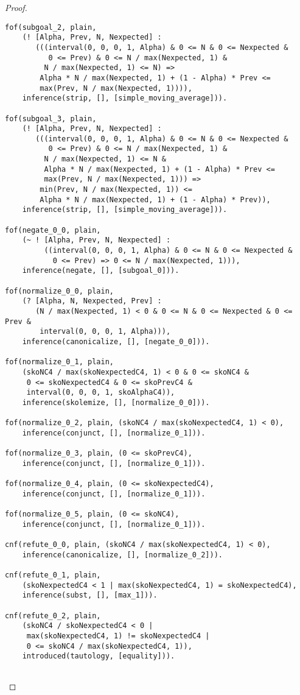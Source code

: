 \begin{proof}
\begin{verbatim}
fof(subgoal_2, plain,
    (! [Alpha, Prev, N, Nexpected] :
       (((interval(0, 0, 0, 1, Alpha) & 0 <= N & 0 <= Nexpected &
          0 <= Prev) & 0 <= N / max(Nexpected, 1) &
         N / max(Nexpected, 1) <= N) =>
        Alpha * N / max(Nexpected, 1) + (1 - Alpha) * Prev <=
        max(Prev, N / max(Nexpected, 1)))),
    inference(strip, [], [simple_moving_average])).

fof(subgoal_3, plain,
    (! [Alpha, Prev, N, Nexpected] :
       (((interval(0, 0, 0, 1, Alpha) & 0 <= N & 0 <= Nexpected &
          0 <= Prev) & 0 <= N / max(Nexpected, 1) &
         N / max(Nexpected, 1) <= N &
         Alpha * N / max(Nexpected, 1) + (1 - Alpha) * Prev <=
         max(Prev, N / max(Nexpected, 1))) =>
        min(Prev, N / max(Nexpected, 1)) <=
        Alpha * N / max(Nexpected, 1) + (1 - Alpha) * Prev)),
    inference(strip, [], [simple_moving_average])).

fof(negate_0_0, plain,
    (~ ! [Alpha, Prev, N, Nexpected] :
         ((interval(0, 0, 0, 1, Alpha) & 0 <= N & 0 <= Nexpected &
           0 <= Prev) => 0 <= N / max(Nexpected, 1))),
    inference(negate, [], [subgoal_0])).

fof(normalize_0_0, plain,
    (? [Alpha, N, Nexpected, Prev] :
       (N / max(Nexpected, 1) < 0 & 0 <= N & 0 <= Nexpected & 0 <= Prev &
        interval(0, 0, 0, 1, Alpha))),
    inference(canonicalize, [], [negate_0_0])).

fof(normalize_0_1, plain,
    (skoNC4 / max(skoNexpectedC4, 1) < 0 & 0 <= skoNC4 &
     0 <= skoNexpectedC4 & 0 <= skoPrevC4 &
     interval(0, 0, 0, 1, skoAlphaC4)),
    inference(skolemize, [], [normalize_0_0])).

fof(normalize_0_2, plain, (skoNC4 / max(skoNexpectedC4, 1) < 0),
    inference(conjunct, [], [normalize_0_1])).

fof(normalize_0_3, plain, (0 <= skoPrevC4),
    inference(conjunct, [], [normalize_0_1])).

fof(normalize_0_4, plain, (0 <= skoNexpectedC4),
    inference(conjunct, [], [normalize_0_1])).

fof(normalize_0_5, plain, (0 <= skoNC4),
    inference(conjunct, [], [normalize_0_1])).

cnf(refute_0_0, plain, (skoNC4 / max(skoNexpectedC4, 1) < 0),
    inference(canonicalize, [], [normalize_0_2])).

cnf(refute_0_1, plain,
    (skoNexpectedC4 < 1 | max(skoNexpectedC4, 1) = skoNexpectedC4),
    inference(subst, [], [max_1])).

cnf(refute_0_2, plain,
    (skoNC4 / skoNexpectedC4 < 0 |
     max(skoNexpectedC4, 1) != skoNexpectedC4 |
     0 <= skoNC4 / max(skoNexpectedC4, 1)),
    introduced(tautology, [equality])).


\end{verbatim}
\end{proof}

